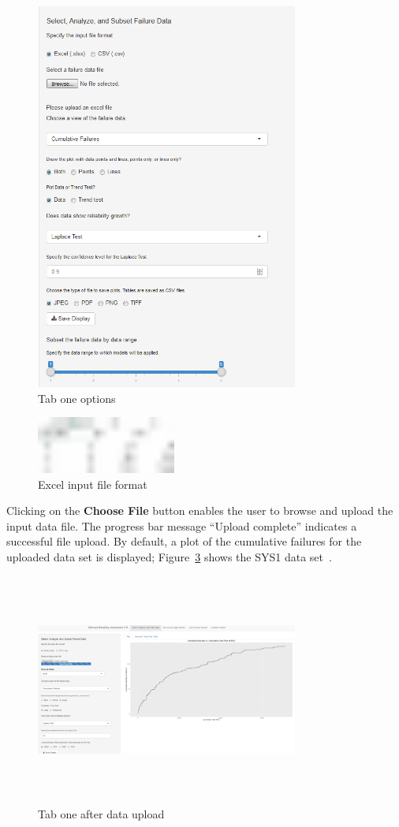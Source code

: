 \documentclass[conference]{IEEEtran}
\begin{document}
\begin{figure}[!h]
\centering
\includegraphics[width=3.4in]{Figures/Fig2}
\caption{Tab one options}
\label{fig_Tab1_leftCol}
\end{figure}

\begin{figure}[!h]
\centering
\includegraphics[width=1.8in]{Figures/sys1excel}
\caption{Excel input file format}
\label{fig_Excel_sys1}
\end{figure}

Clicking on the \textbf{Choose File} button enables the user to browse and upload the input data file. The progress bar message ``Upload complete'' indicates a successful file upload. By default, a plot of the cumulative failures for the uploaded data set is displayed; Figure~\ref{fig_Tab1_CDF} shows the SYS1 data set~\cite{BookHoSRE}.

\begin{figure}[!h]
\centering
\includegraphics[width=3.4in, height=3in]{Figures/Fig4}
\caption{Tab one after data upload}
\label{fig_Tab1_CDF}
\end{figure}
\end{document}
